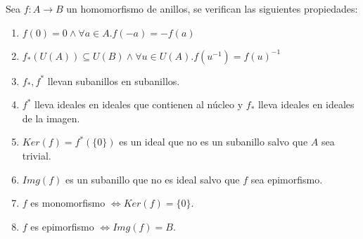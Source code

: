 \begin{proposition}
	Sea $f: A \to B$ un homomorfismo de anillos, se verifican las siguientes propiedades:
	
	\begin{enumerate}
		\item $f(0) = 0 \land \forall a \in A. f(-a) = -f(a)$
		\item $f_*(U(A)) \subseteq U(B) \land \forall u \in U(A).f(u^{-1}) = f(u)^{-1}$
		\item $f_*,f^*$ llevan subanillos en subanillos. 
		\item $f^*$ lleva ideales en ideales que contienen al núcleo y $f_*$ lleva ideales en ideales de la imagen. 
		\item $Ker(f) = f^*(\{0\})$ es un ideal que no es un subanillo salvo que $A$ sea trivial. 
		\item $Img(f)$ es un subanillo que no es ideal salvo que $f$ sea epimorfismo. 
		\item $f$ es monomorfismo $\iff Ker(f) = \{0\}$.
		\item $f$ es epimorfismo $\iff Img(f) = B$.
	\end{enumerate}
\end{proposition}
